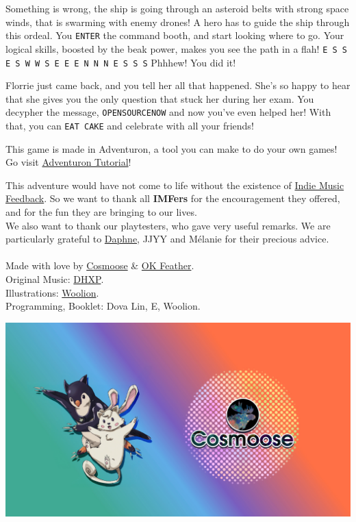 \documentclass{article}
\newcommand{\bbro}[1] {\textbf{\textcolor{darksienna}{#1}}}
\newcommand{\bckg}[1]{\AddToShipoutPictureBG*{\texttt{[image: \#1]}}}
\begin{document}
Something is wrong, the ship is going through an asteroid belts with strong space winds,
that is swarming with enemy drones! A hero has to guide the ship through this ordeal.
You \texttt{ENTER} the command booth, and start looking where to go.
Your logical skills, boosted by the beak power, makes you see the path in a flah!
\texttt{E S S E S W W S E E E N N N E S S S}
Phhhew! You did it!

Florrie just came back, and you tell her all that happened.
She's so happy to hear that she gives you the only question that stuck her during her exam.
You decypher the message, \texttt{OPENSOURCENOW} and now you've even helped her!
With that, you can \texttt{EAT CAKE} and celebrate with all your friends!

\clearpage

\bckg{img/bg}

This game is made in Adventuron, a tool you can make to do your own games!
Go visit \href{https://adventuron.io/documentation/tutorial-a.html}{Adventuron Tutorial}!

This adventure would have not come to life without the existence of \href{https://indiemusicfeedback.com}{Indie Music Feedback}.
So we want to thank all \bbro{IMFers} for the encouragement they offered, and for the fun they are bringing to our lives.\\

We also want to thank our playtesters, who gave very useful remarks.
We are particularly grateful to \href{https://daphnecerez.carrd.co/}{Daphne},
JJYY and Mélanie for their precious advice.\\

\phantom{*}\\
Made with love by \href{https://cosmoose.org/}{Cosmoose} \& \href{https://okfeather.com/}{OK Feather}.\\
Original Music: \href{https://linktr.ee/dhxp}{DHXP}.\\
Illustrations: \href{https://twitter.com/wooliondraws}{Woolion}.\\
Programming, Booklet: Dova Lin, E, Woolion.

\vspace*{\fill}

\begin{center}
    \includegraphics[height=.3\paperheight]{img/ccend}
\end{center}


\clearpage
\end{document}

